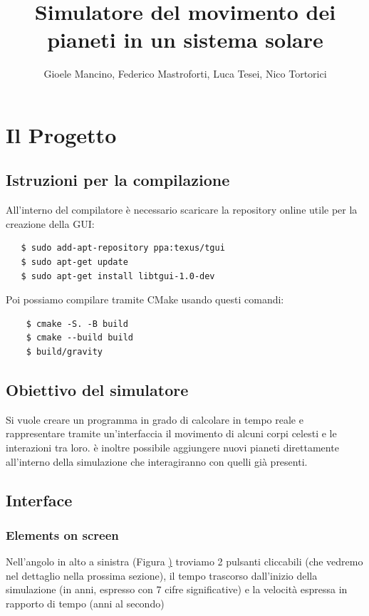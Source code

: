 \documentclass{article}
\title{Simulatore del movimento dei pianeti in un sistema solare}
\author{Gioele Mancino, Federico Mastroforti, Luca Tesei, Nico Tortorici}
\begin{document}
\maketitle
\section{Il Progetto}
\subsection{Istruzioni per la compilazione}
All'interno del compilatore è necessario scaricare la repository online utile per la creazione della GUI:
\begin{verbatim}
   $ sudo add-apt-repository ppa:texus/tgui
   $ sudo apt-get update
   $ sudo apt-get install libtgui-1.0-dev
    \end{verbatim}
Poi possiamo compilare tramite CMake usando questi comandi:
\begin{verbatim}
    $ cmake -S. -B build
    $ cmake --build build
    $ build/gravity
     \end{verbatim}

\subsection{Obiettivo del simulatore}
Si vuole creare un programma in grado di calcolare in tempo reale e rappresentare tramite
un'interfaccia il movimento di alcuni corpi celesti e le interazioni tra loro. è inoltre possibile aggiungere nuovi pianeti direttamente all'interno della simulazione che interagiranno con quelli già presenti.

\subsection{Interface}
\subsubsection{Elements on screen}
Nell'angolo in alto a sinistra (Figura \href{playpause} ) troviamo 2 pulsanti cliccabili (che vedremo nel dettaglio nella prossima sezione), 
il tempo trascorso dall'inizio della simulazione (in anni, espresso con 7 cifre significative) e la velocità espressa in rapporto di tempo (anni al secondo)
\end{document}
